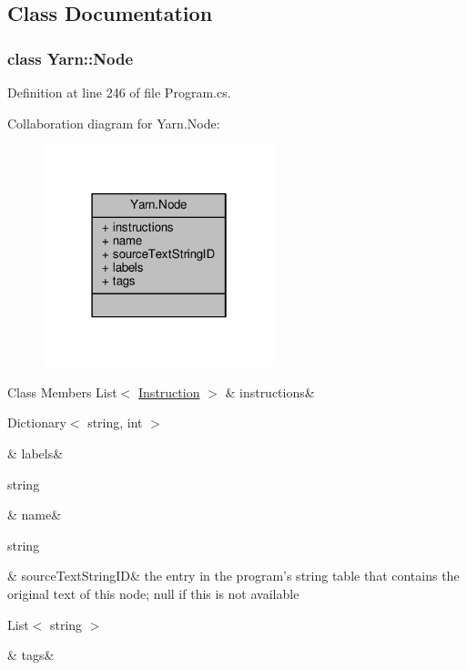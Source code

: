 \subsection{Class Documentation}
\label{a00361}
\hypertarget{a00041_a00361}{}
\subsubsection{class Yarn\-:\-:Node}


Definition at line 246 of file Program.\-cs.



Collaboration diagram for Yarn.\-Node\-:
\nopagebreak
\begin{figure}[H]
\begin{center}
\leavevmode
\includegraphics[width=190pt]{a00375}
\end{center}
\end{figure}
\begin{DoxyFields}{Class Members}
\hypertarget{a00041_a156723a9252b62d288ddf611939ea7c3}{List$<$ \hyperlink{a00109}{Instruction} $>$}\label{a00041_a156723a9252b62d288ddf611939ea7c3}
&
instructions&
\\
\hline

\hypertarget{a00041_a9afa49f4fbc72e806a0210cb4198f12e}{Dictionary$<$ string, int $>$}\label{a00041_a9afa49f4fbc72e806a0210cb4198f12e}
&
labels&
\\
\hline

\hypertarget{a00041_a107b0de3fcfc65e99913edc01b5ce9db}{string}\label{a00041_a107b0de3fcfc65e99913edc01b5ce9db}
&
name&
\\
\hline

\hypertarget{a00041_a09c6af5b50925d0876283b84281b3ed4}{string}\label{a00041_a09c6af5b50925d0876283b84281b3ed4}
&
source\-Text\-String\-I\-D&
the entry in the program's string table that contains the original text of this node; null if this is not available \\
\hline

\hypertarget{a00041_a811086feceebbe79a74eba071c1d516b}{List$<$ string $>$}\label{a00041_a811086feceebbe79a74eba071c1d516b}
&
tags&
\\
\hline

\end{DoxyFields}

